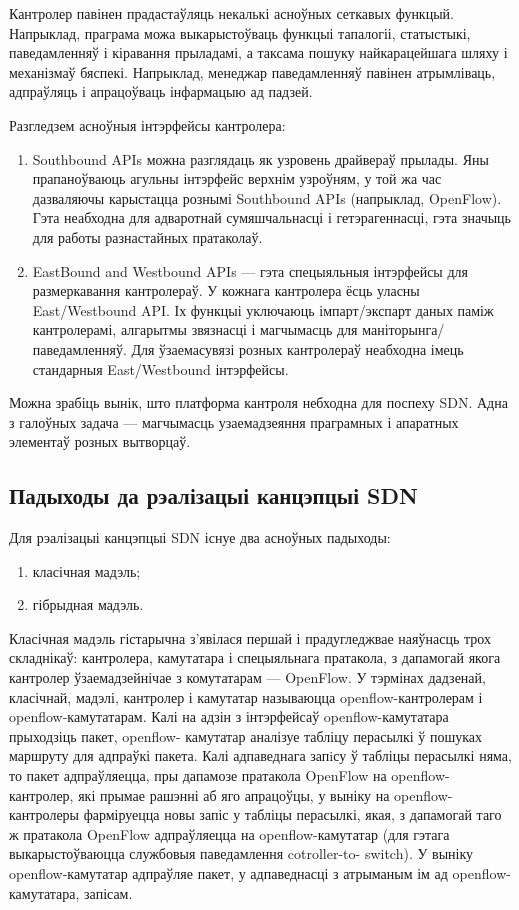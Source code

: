 Кантролер павінен прадастаўляць некалькі асноўных сеткавых функцый.
Напрыклад, праграма можа выкарыстоўваць функцыі тапалогіі, статыстыкі, паведамленняў і
кіравання прыладамі, а таксама пошуку найкарацейшага шляху і механізмаў бяспекі.
Напрыклад, менеджар паведамленняў павінен атрымліваць, адпраўляць і апрацоўваць
інфармацыю ад падзей.

Разгледзем асноўныя інтэрфейсы кантролера:
\begin{enumerate}
    \item Southbound APIs можна разглядаць як узровень драйвераў прылады.
    Яны прапаноўваюць агульны інтэрфейс верхнім узроўням, у той жа час дазваляючы
    карыстацца рознымі Southbound APIs (напрыклад, OpenFlow). Гэта неабходна для
    адваротнай сумяшчальнасці і гетэрагеннасці, гэта значыць для работы разнастайных
    пратаколаў.
    \item EastBound and Westbound APIs --- гэта спецыяльныя інтэрфейсы для размеркавання
    кантролераў. У кожнага кантролера ёсць уласны East/Westbound API. Іх функцыі уключаюць
    імпарт/экспарт даных паміж кантролерамі, алгарытмы звязнасці і магчымасць для
    маніторынга/паведамленняў. Для ўзаемасувязі розных кантролераў неабходна
    імець стандарныя East/Westbound інтэрфейсы.
\end{enumerate}

Можна зрабіць вынік, што платформа кантроля небходна для поспеху SDN. Адна з галоўных
задача --- магчымасць узаемадзеяння праграмных і апаратных элементаў розных вытворцаў.

\subsection{Падыходы да рэалізацыі канцэпцыі SDN}

Для рэалізацыі канцэпцыі SDN існуе два асноўных падыходы:
\begin{enumerate}
    \item класічная мадэль;
    \item гібрыдная мадэль.
\end{enumerate}

Класічная мадэль гістарычна з'явілася першай і прадугледжвае наяўнасць трох складнікаў: кантролера, камутатара і спецыяльнага пратакола, з дапамогай якога кантролер ўзаемадзейнічае з комутатарам --- OpenFlow.
У тэрмінах дадзенай, класічнай, мадэлі, кантролер і камутатар
называюцца openflow-кантролерам і openflow-камутатарам.
Калі на адзін з інтэрфейсаў openflow-камутатара прыходзіць пакет, openflow-
камутатар аналізуе табліцу перасылкі ў пошуках маршруту для адпраўкі пакета.
Калі адпаведнага запiсу ў табліцы перасылкі няма, то пакет адпраўляецца, пры дапамозе пратакола OpenFlow на openflow-кантролер, які прымае рашэнні аб
яго апрацоўцы, у выніку на openflow-кантролеры фарміруецца новы запіс у табліцы перасылкі, якая, з дапамогай таго ж пратакола OpenFlow адпраўляецца на
openflow-камутатар (для гэтага выкарыстоўваюцца службовыя паведамлення cotroller-to-
switch). У выніку openflow-камутатар адпраўляе пакет, у адпаведнасці з атрыманым ім ад openflow-камутатара, запісам.

